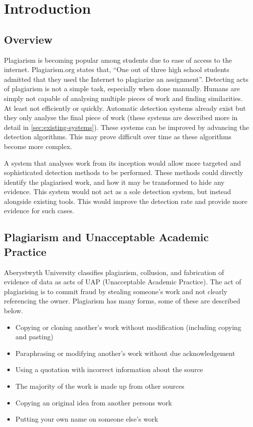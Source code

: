 \chapter{Introduction}
\label{chp:introduction}
\section{Overview}
Plagiarism is becoming popular among students due to ease of access to the internet. Plagiarism.org states that, ``One out of three high school students admitted that they used the Internet to plagiarize an assignment''\cite{PlagiarismorgFacts}. Detecting acts of plagiarism is not a simple task, especially when done manually. Humans are simply not capable of analysing multiple pieces of work and finding similarities. At least not efficiently or quickly. Automatic detection systems already exist but they only analyse the final piece of work (these systems are described more in detail in \autoref{sec:existing-systems}). These systems can be improved by advancing the detection algorithms. This may prove difficult over time as these algorithms become more complex.

A system that analyses work from its inception would allow more targeted and sophisticated detection methods to be performed. These methods could directly identify the plagiarised work, and how it may be transformed to hide any evidence. This system would not act as a sole detection system, but instead alongside existing tools. This would improve the detection rate and provide more evidence for such cases.

\section{Plagiarism and Unacceptable Academic Practice}
Aberystwyth University classifies plagiarism, collusion, and fabrication of evidence of data as acts of UAP (Unacceptable Academic Practice)\cite{AberUniUAP}. The act of plagiarising is to commit fraud by stealing someone's work and not clearly referencing the owner\cite{PlagiarismorgWhat}. Plagiarism has many forms, some of these are described below\cite{AberUniUAP}\cite{PlagiarismorgWhat}\cite{TurnitinPlagiarismSpectrum}\cite{Clough03oldand}.

\begin{itemize}
  \item Copying or cloning another's work without modification (including copying and pasting)
  \item Paraphrasing or modifying another's work without due acknowledgement
  \item Using a quotation with incorrect information about the source
  \item The majority of the work is made up from other sources
  \item Copying an original idea from another persons work
  \item Putting your own name on someone else's work  
\end{itemize}

